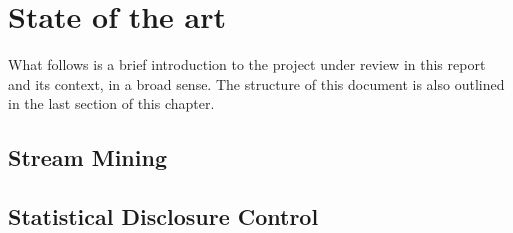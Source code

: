 \chapter{State of the art} %
\label{Chapter3StateOfTheArt} %


What follows is a brief introduction to the project under review in this report and its context,
in a broad sense. The structure of this document is also outlined in the last section of this chapter.

\section{Stream Mining}
\label{State::StreamMining}


\section{Statistical Disclosure Control}
\label{State::SDC}
